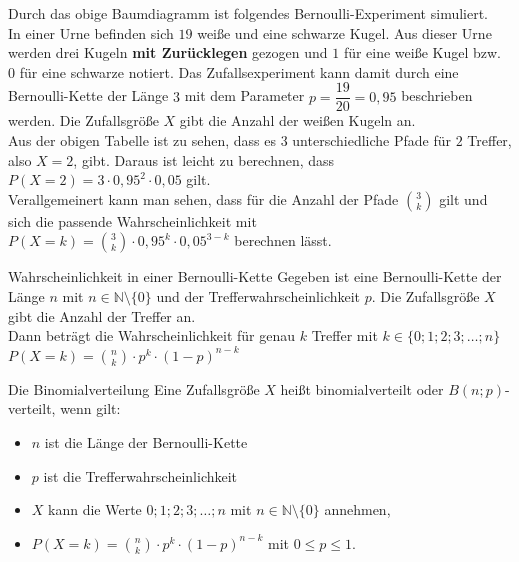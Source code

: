  \begin{bsp}{}{}
Durch das obige Baumdiagramm ist folgendes Bernoulli-Experiment simuliert. \\ In einer Urne befinden sich \(19\) weiße und eine schwarze Kugel. Aus dieser Urne werden drei Kugeln \textbf{mit Zurücklegen} gezogen und  \(1\) für eine weiße Kugel bzw. \(0\) für eine schwarze notiert. Das Zufallsexperiment kann damit durch eine Bernoulli-Kette der Länge \(3\) mit dem Parameter \(p=\dfrac{19}{20} = 0,95\) beschrieben werden. Die Zufallsgröße \(X\) gibt die Anzahl der weißen Kugeln an. \\[0.2cm]
Aus der obigen Tabelle ist zu sehen, dass es 3  unterschiedliche Pfade für \(2\) Treffer, also \(X=2\),  gibt. Daraus ist leicht zu berechnen, dass \(P(X=2) = 3\cdot 0,95^2\cdot 0,05\) gilt.\\[0.2cm] Verallgemeinert kann man sehen, dass für die Anzahl der Pfade \(\binom{3}{k}\) gilt und sich die passende Wahrscheinlichkeit mit\\[0.2cm]  \(P(X=k) =\binom{3}{k} \cdot 0{,}95^k \cdot 0{,}05^{3-k} \) berechnen lässt.
\end{bsp}
\begin{satz}{Wahrscheinlichkeit in einer Bernoulli-Kette}{}
    Gegeben ist eine Bernoulli-Kette der Länge \(n\) mit \(n \in \mathds{N}\setminus\{0\}\) und der Trefferwahrscheinlichkeit \(p\). Die Zufallsgröße \(X\) gibt die Anzahl der Treffer an. \\[0.2cm]
    Dann beträgt die Wahrscheinlichkeit für genau \(k\) Treffer mit \(k\in\{0;1;2;3;\ldots ; n\}\) \\ \(P(X=k) = \binom{n}{k}\cdot p^k \cdot \left(1-p\right)^{n-k}\)
\end{satz}
\begin{defi}{Die Binomialverteilung}{}
 Eine Zufallsgröße \(X\) heißt binomialverteilt oder \(B(n;p)\)-verteilt, wenn gilt:
 \begin{itemize}
    \item \(n\) ist die Länge der Bernoulli-Kette
    \item \(p\) ist die Trefferwahrscheinlichkeit
     \item \(X\) kann die Werte \(0;1;2;3; \ldots ; n\) mit \(n\in \mathds{N}\setminus \{0\}\) annehmen,
     \item \(P(X=k) = \binom{n}{k}\cdot p^k \cdot \left(1-p\right)^{n-k}\) mit \(0\leq p\leq 1\).
 \end{itemize}
\end{defi}
